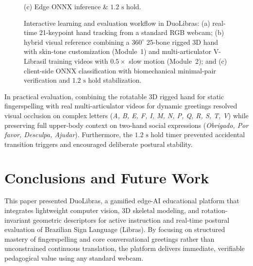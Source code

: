 \documentclass[12pt,a4paper]{article}
\begin{document}
\begin{figure}[htbp]
\begin{minipage}[t]{0.31\textwidth}
        \par\vspace{3pt}
        {\footnotesize (c) Edge ONNX inference \& $1.2\text{ s}$ hold.}
    \end{minipage}
    \caption{Interactive learning and evaluation workflow in DuoLibras: (a) real-time 21-keypoint hand tracking from a standard RGB webcam; (b) hybrid visual reference combining a $360^\circ$ 25-bone rigged 3D hand with skin-tone customization (Module~1) and multi-articulator V-Librasil training videos with $0.5\times$ slow motion (Module~2); and (c) client-side ONNX classification with biomechanical minimal-pair verification and $1.2\text{ s}$ hold stabilization.}
    \label{fig:duolibras_interface}
\end{figure}

In practical evaluation, combining the rotatable 3D rigged hand for static fingerspelling with real multi-articulator videos for dynamic greetings resolved visual occlusion on complex letters (\textit{A, B, E, F, I, M, N, P, Q, R, S, T, V}) while preserving full upper-body context on two-hand social expressions (\textit{Obrigado, Por favor, Desculpa, Ajudar}). Furthermore, the $1.2\text{ s}$ hold timer prevented accidental transition triggers and encouraged deliberate postural stability.


\section{Conclusions and Future Work}
\label{sec:conclusion}

This paper presented DuoLibras, a gamified edge-AI educational platform that integrates lightweight computer vision, 3D skeletal modeling, and rotation-invariant geometric descriptors for active instruction and real-time postural evaluation of Brazilian Sign Language (Libras). By focusing on structured mastery of fingerspelling and core conversational greetings rather than unconstrained continuous translation, the platform delivers immediate, verifiable pedagogical value using any standard webcam.
\end{document}
